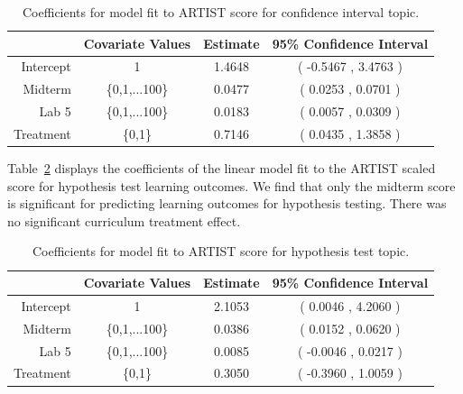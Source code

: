 \documentclass[11pt]{isuthesis}\usepackage[]{graphicx}\usepackage[]{color}
\begin{document}
\begin{table}[hbtp]
\centering
\begin{tabular}{rccc}
  \hline
 & Covariate Values & Estimate & 95\% Confidence Interval \\ 
  \hline
Intercept & 1 & 1.4648 & ( -0.5467 , 3.4763 ) \\ 
  Midterm & \{0,1,...100\} & 0.0477 & (  0.0253 , 0.0701 ) \\ 
  Lab 5  &  \{0,1,...100\} & 0.0183 & (  0.0057 , 0.0309 ) \\ 
  Treatment &  \{0,1\} & 0.7146 & (  0.0435 , 1.3858 ) \\ 
   \hline
\end{tabular}
\caption{Coefficients for model fit to ARTIST score for confidence interval topic.}
\label{tab:cimod}
\end{table}

Table~\ref{tab:htmod} displays the coefficients of the linear model fit to the ARTIST scaled score for hypothesis test learning outcomes.  We find that only the midterm score is significant for predicting learning outcomes for hypothesis testing. There was no significant curriculum treatment effect. \\

\begin{table}[hbtp]
\centering
\begin{tabular}{rccc}
  \hline
 & Covariate Values & Estimate & 95\% Confidence Interval \\ 
  \hline
Intercept & 1 & 2.1053 & ( 0.0046 , 4.2060 ) \\ 
  Midterm & \{0,1,...100\} & 0.0386 & (  0.0152 , 0.0620 ) \\ 
  Lab 5  &  \{0,1,...100\} & 0.0085 & (  -0.0046 , 0.0217 ) \\ 
  Treatment &  \{0,1\} & 0.3050 & (  -0.3960 , 1.0059 ) \\ 
   \hline
\end{tabular}
\caption{Coefficients for model fit to ARTIST score for hypothesis test topic.}
\label{tab:htmod}
\end{table}
\end{document}
